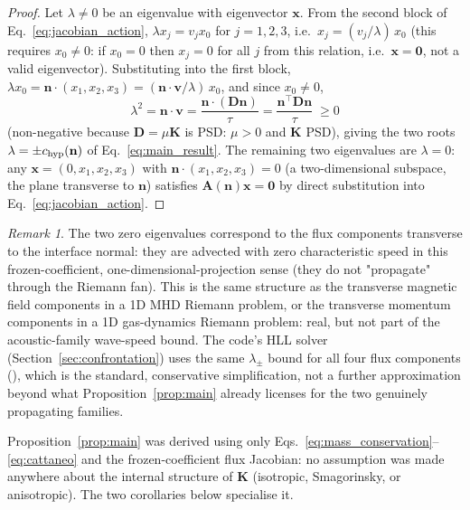 \documentclass[11pt, a4paper, parskip]{scrartcl}
\newcommand{\code}[1]{\texttt{\seqsplit{#1}}}
\theoremstyle{plain}
\theoremstyle{definition}
\theoremstyle{remark}
\newtheorem{remark}{Remark}
\newcommand{\Kmat}{\mathbf{K}}                            %
\newcommand{\nunit}{\mathbf{n}}                           %
\newcommand{\chyp}{c_{\rm hyp}}                           %
\newcommand{\taurelax}{\tau}                              %
\newcommand{\Deff}{\mathbf{D}}                            %
\begin{document}
\begin{proof}
Let $\lambda\neq0$ be an eigenvalue with eigenvector $\mathbf x$. From the
second block of Eq.~\eqref{eq:jacobian_action}, $\lambda x_j = v_j x_0$ for
$j=1,2,3$, i.e.\ $x_j = (v_j/\lambda)\,x_0$ (this requires $x_0\neq0$: if
$x_0=0$ then $x_j=0$ for all $j$ from this relation, i.e.\ $\mathbf
x=\mathbf 0$, not a valid eigenvector). Substituting into the first block,
$\lambda x_0 = \nunit\cdot(x_1,x_2,x_3) = (\nunit\cdot\mathbf v/\lambda)\,x_0$,
and since $x_0\neq0$,
\begin{equation}
  \lambda^2 = \nunit\cdot\mathbf v = \frac{\nunit\cdot(\Deff\nunit)}{\taurelax} = \frac{\nunit^{\!\top}\Deff\nunit}{\taurelax} \; \geq 0
\end{equation}
(non-negative because $\Deff=\mu\Kmat$ is PSD: $\mu>0$ and $\Kmat$ PSD),
giving the two roots
$\lambda=\pm\chyp(\nunit)$ of Eq.~\eqref{eq:main_result}. The remaining two
eigenvalues are $\lambda=0$: any $\mathbf x=(0,x_1,x_2,x_3)$ with
$\nunit\cdot(x_1,x_2,x_3)=0$ (a two-dimensional subspace, the plane
transverse to $\nunit$) satisfies $\mathbf A(\nunit)\mathbf x=\mathbf 0$
by direct substitution into Eq.~\eqref{eq:jacobian_action}.
\end{proof}

\begin{remark}
The two zero eigenvalues correspond to the flux components transverse to
the interface normal: they are advected with zero characteristic speed in
this frozen-coefficient, one-dimensional-projection sense (they do not
"propagate" through the Riemann fan). This is the same structure as the
transverse magnetic field components in a 1D MHD Riemann problem, or the
transverse momentum components in a 1D gas-dynamics Riemann problem: real,
but not part of the acoustic-family wave-speed bound. The code's HLL
solver (Section~\ref{sec:confrontation}) uses the same $\lambda_\pm$ bound
for all four flux components (\code{chemistry\_riemann\_HLL.h:112-179}),
which is the standard, conservative simplification, not a further
approximation beyond what Proposition~\ref{prop:main} already licenses for
the two genuinely propagating families.
\end{remark}

Proposition~\ref{prop:main} was derived using only
Eqs.~\eqref{eq:mass_conservation}--\eqref{eq:cattaneo} and the
frozen-coefficient flux Jacobian: no assumption was made anywhere about
the internal structure of $\Kmat$ (isotropic, Smagorinsky, or
anisotropic). The two corollaries below specialise it.
\end{document}
